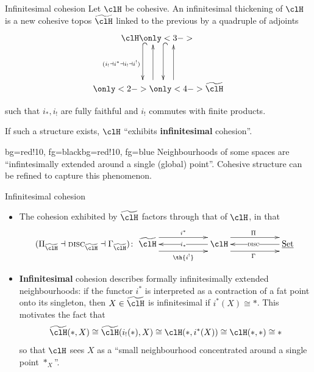 \documentclass[presentation,handout]{beamer}
\begin{document}
\begin{frame}{Infinitesimal cohesion}
  Let $\clH$ be cohesive. An \alert{infinitesimal thickening} of $\clH$ is a new cohesive topos $\thH$ linked to the previous by a quadruple of adjoints
  \[
  \xymatrix@R=1.5cm{
  \clH
  \ar@{^{(}->}@<-18pt>[d]_{(i_! \dashv i^* \dashv i_! \dashv i^!)}
  \only<3->{\ar@{^{(}->}@<6pt>[d]}
  \\
  \ar@[white]@<-18pt>[u]
  \only<2->{\ar@<6pt>[u]}
  \only<4->{\ar@<-18pt>[u]}
  \thH
  }
  \]
  
  \vspace*{\fill}
  such that $i_*, i_!$ are fully faithful and $i_!$ commutes with finite products.
  
  If such a structure exists, $\clH$ ``exhibits \textbf{infinitesimal} cohesion''.
  \begin{variableblock}{}{bg=red!10, fg=black}{bg=red!10, fg=blue}
    \small Neighbourhoods of some spaces are ``infintesimally extended around a single (global) point''. Cohesive structure can be refined to capture this phenomenon.
  \end{variableblock}
\end{frame}
%
%
%
%
%
%
%
\begin{frame}{Infinitesimal cohesion}
  \begin{itemize}
    \item<+-> The cohesion exhibited by $\thH$ \alert{factors through} that of $\clH$, in that
    \[
    (\Pi_{\thH} \dashv \disc_{\thH} \dashv \Gamma_{\thH})
    \colon
    \xymatrix@C=2cm{
    \thH \ar@<-8pt>[r]_{\th{i^!}} \ar@{<-}[r]|{i_*} \ar@<8pt>[r]^{i^*} &
    \clH \ar@<-8pt>[r]_\Gamma \ar@{<-}[r]|{\disc} \ar@<8pt>[r]^\Pi &
    \Set
    }
    \]
    \item<+-> \textbf{Infinitesimal} cohesion describes formally infinitesimally extended neighbourhoods: if the functor $i^*$ is interpreted as a \alert{contraction} of a fat point onto its singleton, then $X\in \thH$ is infinitesimal if $i^*(X)\cong *$. \onslide<+->This motivates the fact that
    \[
    \thH(*,X)\cong \thH(i_!(*),X)\cong \clH(*,i^*(X))\cong \clH(*,*)\cong *
    \]
    so that $\clH$ sees $X$ as a  ``small neighbourhood concentrated around a single point $*_X$''.
  \end{itemize}
\end{frame}
%
%
%
%
%
%
%
\end{document}
